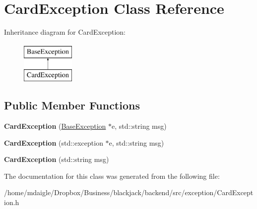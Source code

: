 \hypertarget{classCardException}{
\section{\-Card\-Exception \-Class \-Reference}
\label{d8/d6a/classCardException}
}
\-Inheritance diagram for \-Card\-Exception\-:\begin{figure}[H]
\begin{center}
\leavevmode
\includegraphics[height=2.000000cm]{d8/d6a/classCardException}
\end{center}
\end{figure}
\subsection*{\-Public \-Member \-Functions}
\begin{DoxyCompactItemize}
\item 
\hypertarget{classCardException_a3e28f7ba8484a2da4562d6ee4a877b00}{
{\bfseries \-Card\-Exception} (\hyperlink{classBaseException}{\-Base\-Exception} $\ast$e, std\-::string msg)}
\label{d8/d6a/classCardException_a3e28f7ba8484a2da4562d6ee4a877b00}

\item 
\hypertarget{classCardException_a7e7cf55fdd0d0bff3d5075d74bb97d0f}{
{\bfseries \-Card\-Exception} (std\-::exception $\ast$e, std\-::string msg)}
\label{d8/d6a/classCardException_a7e7cf55fdd0d0bff3d5075d74bb97d0f}

\item 
\hypertarget{classCardException_a055c192dae1bf039f181ec91a9d3909f}{
{\bfseries \-Card\-Exception} (std\-::string msg)}
\label{d8/d6a/classCardException_a055c192dae1bf039f181ec91a9d3909f}

\end{DoxyCompactItemize}


\-The documentation for this class was generated from the following file\-:\begin{DoxyCompactItemize}
\item 
/home/mdaigle/\-Dropbox/\-Business/blackjack/backend/src/exception/\-Card\-Exception.\-h\end{DoxyCompactItemize}

